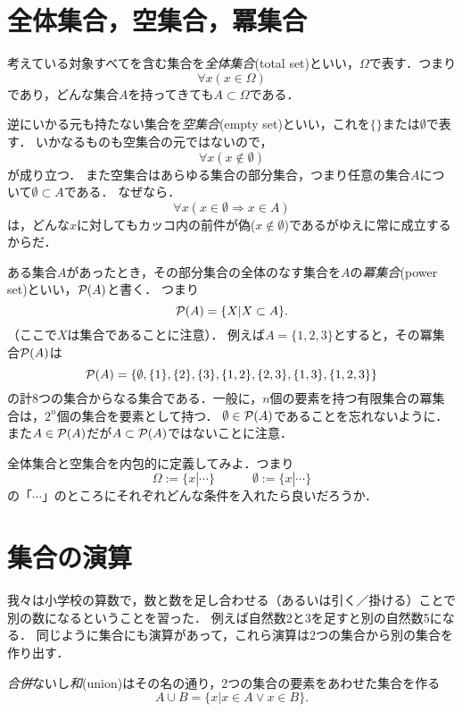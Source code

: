 \documentclass[11pt,a4paper]{jsarticle}
\begin{document}
\section{全体集合，空集合，冪集合}
考えている対象すべてを含む集合を\emph{全体集合}(total set)といい，$\Omega$で表す．つまり
\[
\forall x (x \in \Omega)
\]
であり，どんな集合$A$を持ってきても$A \subset \Omega$である．

逆にいかる元も持たない集合を\emph{空集合}(empty set)といい，これを$\{\}$または$\emptyset$で表す．
いかなるものも空集合の元ではないので，
\[
\forall x (x \not\in \emptyset)
\]
が成り立つ．
また空集合はあらゆる集合の部分集合，つまり任意の集合$A$について$\emptyset \subset A$である．
なぜなら．
\[
\forall x (x \in \emptyset \Rightarrow x \in A)
\]
は，どんな$x$に対してもカッコ内の前件が偽($x \not\in \emptyset$)であるがゆえに常に成立するからだ．

ある集合$A$があったとき，その部分集合の全体のなす集合を$A$の\emph{冪集合}(power set)といい，$\mathcal{P}(A)$と書く．
つまり
\[
 \mathcal{P}(A) = \{ X| X \subset A \}.
\]
（ここで$X$は集合であることに注意）．
例えば$A = \{1, 2, 3\}$とすると，その冪集合$\mathcal{P}(A)$は
\[
 \mathcal{P}(A) = \{ \emptyset, \{1\}, \{2\}, \{3\}, \{1,2\}, \{2,3\}, \{1,3\}, \{1,2,3\} \}
\]
の計8つの集合からなる集合である．一般に，$n$個の要素を持つ有限集合の冪集合は，$2^n$個の集合を要素として持つ．
$\emptyset \in \mathcal{P}(A)$であることを忘れないように．
また$A \in \mathcal{P}(A)$だが$A \subset \mathcal{P}(A)$ではないことに注意．



\begin{exercise}
全体集合と空集合を内包的に定義してみよ．つまり
\[
\Omega := \{ x | \cdots \}  \hspace{3em} \emptyset := \{ x | \cdots \}
\]
の「$\cdots$」のところにそれぞれどんな条件を入れたら良いだろうか． 
\end{exercise}



\section{集合の演算}
\label{sec:setoperation}
我々は小学校の算数で，数と数を足し合わせる（あるいは引く／掛ける）ことで別の数になるということを習った．
例えば自然数2と3を足すと別の自然数5になる．
同じように集合にも演算があって，これら演算は2つの集合から別の集合を作り出す．

\emph{合併}ないし\emph{和}(union)はその名の通り，2つの集合の要素をあわせた集合を作る
\[
 A \cup B = \{ x | x \in A \vee x \in B\} .
\]
\end{document}
